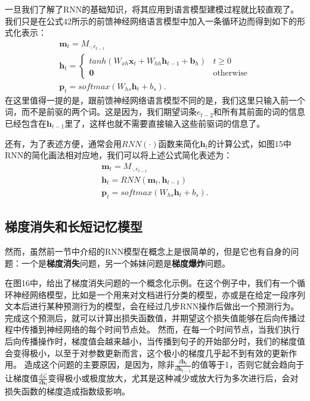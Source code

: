 \documentclass[10pt,a4paper]{ctexart}
\begin{document}
一旦我们了解了RNN的基础知识，将其应用到语言模型建模过程就比较直观了。我们只是在公式42所示的前馈神经网络语言模型中加入一条循环边而得到如下的形式化表示：
\[
 \begin{array}{l}
 \textbf{m}_t = M_{\cdot,e_{t-1}} \\
 \textbf{h}_t = \left\{ \begin{array}{ll}
  tanh(W_{xh}\textbf{x}_t + W_{hh}\textbf{h}_{t-1}+\textbf{b}_h) & t \geq 0 \\
  \textbf{0} & \textrm{otherwise}
  \end{array} \right. \\
 \textbf{p}_t = softmax(W_{hs}\textbf{h}_t + b_s).
 \end{array}
\]
在这里值得一提的是，跟前馈神经网络语言模型不同的是，我们这里只输入前一个词，而不是前驱的两个词。这是因为，我们期望词条$e_{t-2}$和所有其前面的词的信息已经包含在$\textbf{h}_{t-1}$里了，这样也就不需要直接输入这些前驱词的信息了。

还有，为了表述方便，通常会用$RNN(\cdot)$函数来简化$\textbf{h}_t$的计算公式，如图15中RNN的简化画法相对应地，我们可以将上述公式简化表述为：
\[
 \begin{array}{l}
 \textbf{m}_t = M_{\cdot,e_{t-1}} \\
 \textbf{h}_t = RNN(\textbf{m}_t, \textbf{h}_{t-1}) \\
 \textbf{p}_t = softmax(W_{hs}\textbf{h}_t + b_s).
 \end{array}
\]

\subsection{梯度消失和长短记忆模型}
然而，虽然前一节中介绍的RNN模型在概念上是很简单的，但是它也有自身的问题：一个是\textbf{梯度消失}问题，另一个姊妹问题是\textbf{梯度爆炸}问题。

在图16中，给出了梯度消失问题的一个概念化示例。在这个例子中，我们有一个循环神经网络模型，比如是一个用来对文档进行分类的模型，亦或是在给定一段序列文本后进行某种预测行为的模型，会在经过几步RNN操作后做出一个预测行为。
完成这个预测后，就可以计算出损失函数值，并期望这个损失值能够在后向传播过程中传播到神经网络的每个时间节点处。
然而，在每一个时间节点，当我们执行后向传播操作时，梯度值会越来越小，当传播到句子的开始部分时，我们的梯度值会变得极小，以至于对参数更新而言，这个极小的梯度几乎起不到有效的更新作用。
造成这个问题的主要原因，是因为，除非$\frac{d\textbf{h}_{t}}{d\textbf{h}_{t-1}}$的值等于1，否则它就会趋向于让梯度值$\frac{d\mathcal{L}}{d\textbf{h}_t}$变得极小或极度放大，尤其是这种减少或放大行为多次进行后，会对损失函数的梯度造成指数级影响。
\end{document}
